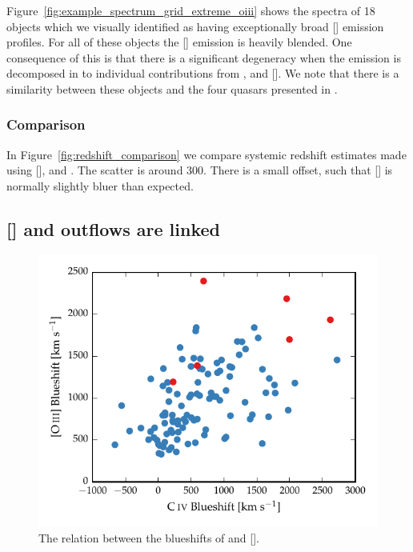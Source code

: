 Figure~\ref{fig:example_spectrum_grid_extreme_oiii} shows the spectra of 18 objects which we visually identified as having exceptionally broad [] emission profiles. 
For all of these objects the [] emission is heavily blended. 
One consequence of this is that there is a significant degeneracy when the emission is decomposed in to individual contributions from , \hb and []. 
We note that there is a similarity between these objects and the four quasars presented in \citet{zakamska16}. 

\subsubsection{Comparison}

In Figure~\ref{fig:redshift_comparison} we compare systemic redshift estimates made using [], \hb and \ha. 
The scatter is around 300\kms. 
There is a small offset, such that [] is normally slightly bluer than expected. 

\subsection{[] and  outflows are linked}


\begin{figure}
    \includegraphics[width=\columnwidth]{figures/chapter04/civ_blueshift_oiii_blueshift.pdf} 
    \caption{The relation between the blueshifts of  and [].}     
    \label{fig:oiii_civ_blueshifts}
\end{figure}

